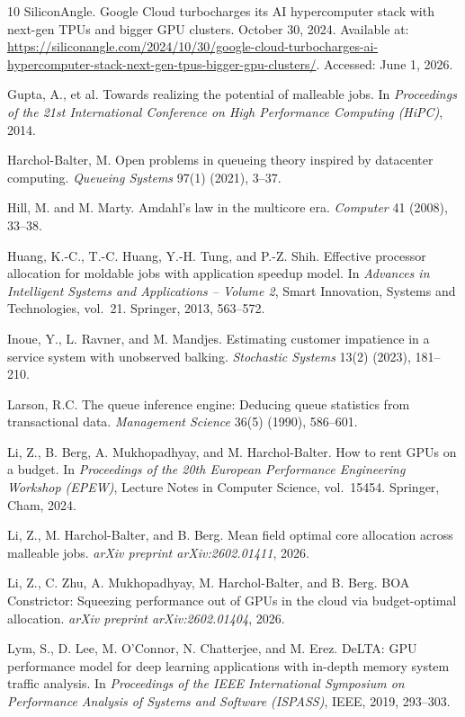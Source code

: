 \documentclass[11pt]{article}
\theoremstyle{remark}
\theoremstyle{definition}
\numberwithin{equation}{section}
\begin{document}
{\begin{thebibliography}{10}
SiliconAngle.
Google Cloud turbocharges its AI hypercomputer stack with next-gen TPUs and bigger GPU clusters.
October 30, 2024.
Available at: {\small \url{https://siliconangle.com/2024/10/30/google-cloud-turbocharges-ai-hypercomputer-stack-next-gen-tpus-bigger-gpu-clusters/}}.
Accessed: June 1, 2026.

Gupta, A., et al.
Towards realizing the potential of malleable jobs.
In \textit{Proceedings of the 21st International Conference on High Performance Computing (HiPC)}, 2014.

Harchol-Balter, M.
Open problems in queueing theory inspired by datacenter computing.
\textit{Queueing Systems} 97(1) (2021), 3--37.

Hill, M. and M. Marty.
Amdahl’s law in the multicore era.
\textit{Computer} 41 (2008), 33--38.

Huang, K.-C., T.-C. Huang, Y.-H. Tung, and P.-Z. Shih.
Effective processor allocation for moldable jobs with application speedup model.
In \textit{Advances in Intelligent Systems and Applications -- Volume 2},
Smart Innovation, Systems and Technologies, vol.\ 21. Springer, 2013, 563--572.

Inoue, Y., L. Ravner, and M. Mandjes.
Estimating customer impatience in a service system with unobserved balking.
\textit{Stochastic Systems} 13(2) (2023), 181--210.

Larson, R.C.
The queue inference engine: Deducing queue statistics from transactional data.
\textit{Management Science} 36(5) (1990), 586--601.

Li, Z., B. Berg, A. Mukhopadhyay, and M. Harchol-Balter.
How to rent GPUs on a budget.
In \textit{Proceedings of the 20th European Performance Engineering Workshop (EPEW)},
Lecture Notes in Computer Science, vol.\ 15454. Springer, Cham, 2024.

Li, Z., M. Harchol-Balter, and B. Berg.
Mean field optimal core allocation across malleable jobs.
\textit{arXiv preprint arXiv:2602.01411}, 2026.

Li, Z., C. Zhu, A. Mukhopadhyay, M. Harchol-Balter, and B. Berg.
BOA Constrictor: Squeezing performance out of GPUs in the cloud via budget-optimal allocation.
\textit{arXiv preprint arXiv:2602.01404}, 2026.

Lym, S., D. Lee, M. O'Connor, N. Chatterjee, and M. Erez.
DeLTA: GPU performance model for deep learning applications with in-depth memory system traffic analysis.
In \textit{Proceedings of the IEEE International Symposium on Performance Analysis of Systems and Software (ISPASS)}, IEEE, 2019, 293--303.


\end{thebibliography}}
\end{document}
